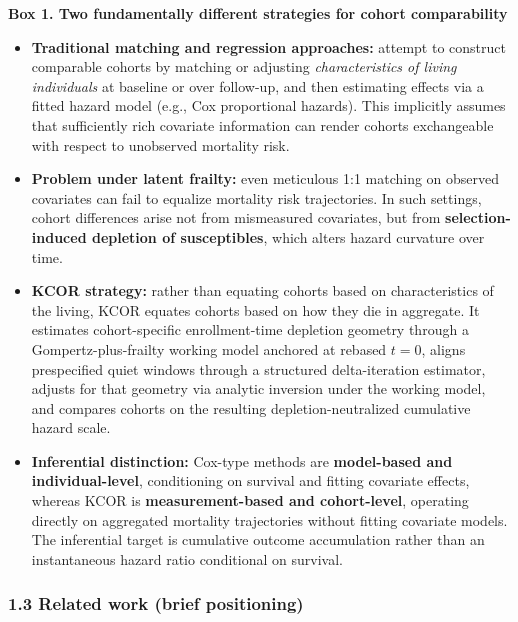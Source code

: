 \documentclass[
]{article}
\renewenvironment{quote}{\begin{mdframed}[style=kcorquote]}{\end{mdframed}}
\begin{document}
\begin{quote}
\textbf{Box 1. Two fundamentally different strategies for cohort comparability}

\begin{itemize}
\item
  \textbf{Traditional matching and regression approaches:} attempt to construct comparable cohorts by matching or adjusting \emph{characteristics of living individuals} at baseline or over follow-up, and then estimating effects via a fitted hazard model (e.g., Cox proportional hazards). This implicitly assumes that sufficiently rich covariate information can render cohorts exchangeable with respect to unobserved mortality risk.
\item
  \textbf{Problem under latent frailty:} even meticulous 1:1 matching on observed covariates can fail to equalize mortality risk trajectories. In such settings, cohort differences arise not from mismeasured covariates, but from \textbf{selection-induced depletion of susceptibles}, which alters hazard curvature over time.
\item
  \textbf{KCOR strategy:} rather than equating cohorts based on characteristics of the living, KCOR equates cohorts based on how they die in aggregate. It estimates cohort-specific enrollment-time depletion geometry through a Gompertz-plus-frailty working model anchored at rebased \(t=0\), aligns prespecified quiet windows through a structured delta-iteration estimator, adjusts for that geometry via analytic inversion under the working model, and compares cohorts on the resulting depletion-neutralized cumulative hazard scale.
\item
  \textbf{Inferential distinction:} Cox-type methods are \textbf{model-based and individual-level}, conditioning on survival and fitting covariate effects, whereas KCOR is \textbf{measurement-based and cohort-level}, operating directly on aggregated mortality trajectories without fitting covariate models. The inferential target is cumulative outcome accumulation rather than an instantaneous hazard ratio conditional on survival.
\end{itemize}
\end{quote}

\subsubsection{1.3 Related work (brief positioning)}\label{related-work-brief-positioning}
\end{document}
